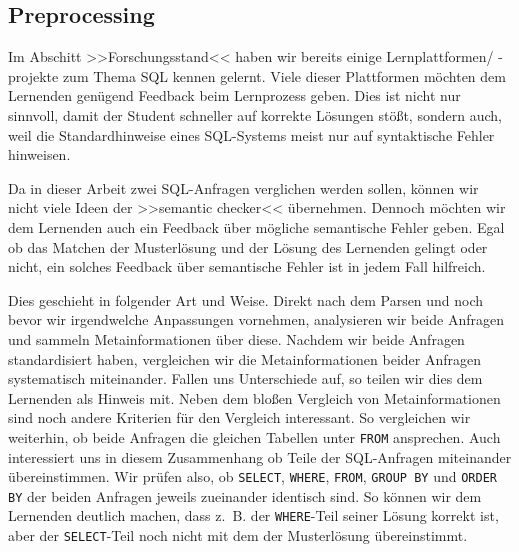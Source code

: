 
\subsection{Preprocessing}
\label{subsec:preprocessing}

Im Abschitt >>Forschungsstand<< haben wir bereits einige Lernplattformen/ -projekte zum Thema SQL kennen gelernt. Viele dieser Plattformen möchten dem Lernenden genügend Feedback beim Lernprozess geben. Dies ist nicht nur sinnvoll, damit der Student schneller auf korrekte Lösungen stößt, sondern auch, weil die Standardhinweise eines SQL-Systems meist nur auf syntaktische Fehler hinweisen.

Da in dieser Arbeit zwei SQL-Anfragen verglichen werden sollen, können wir nicht viele Ideen der >>semantic checker<< übernehmen. Dennoch möchten wir dem Lernenden auch ein Feedback über mögliche semantische Fehler geben. Egal ob das Matchen der Musterlösung und der Lösung des Lernenden gelingt oder nicht, ein solches Feedback über semantische Fehler ist in jedem Fall hilfreich.

Dies geschieht in folgender Art und Weise. Direkt nach dem Parsen und noch bevor wir irgendwelche Anpassungen vornehmen, analysieren wir beide Anfragen und sammeln Metainformationen über diese. Nachdem wir beide Anfragen standardisiert haben, vergleichen wir die Metainformationen beider Anfragen systematisch miteinander. Fallen uns Unterschiede auf, so teilen wir dies dem Lernenden als Hinweis mit. Neben dem bloßen Vergleich von Metainformationen sind noch andere Kriterien für den Vergleich interessant. So vergleichen wir weiterhin, ob beide Anfragen die gleichen Tabellen unter \verb|FROM| ansprechen. Auch interessiert uns in diesem Zusammenhang ob Teile der SQL-Anfragen miteinander übereinstimmen. Wir prüfen also, ob \verb|SELECT|, \verb|WHERE|, \verb|FROM|, \verb|GROUP BY| und \verb|ORDER BY| der beiden Anfragen jeweils zueinander identisch sind. So können wir dem Lernenden deutlich machen, dass \mbox{z. B.} der \verb|WHERE|-Teil seiner Lösung korrekt ist, aber der \verb|SELECT|-Teil noch nicht mit dem der Musterlösung übereinstimmt.

